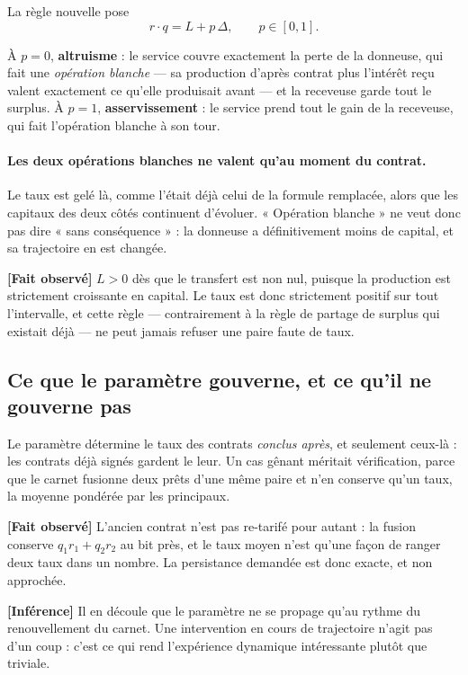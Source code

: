 \documentclass[11pt,a4paper]{article}
\newcommand{\fait}{\textbf{[Fait observé]}}
\newcommand{\inference}{\textbf{[Inférence]}}
\begin{document}
La règle nouvelle pose
\[
r \cdot q = L + p\,\Delta, \qquad p \in [0,1].
\]

À $p = 0$, \textbf{altruisme} : le service couvre exactement la perte de la
donneuse, qui fait une \emph{opération blanche} --- sa production d'après
contrat plus l'intérêt reçu valent exactement ce qu'elle produisait avant ---
et la receveuse garde tout le surplus. À $p = 1$,
\textbf{asservissement} : le service prend tout le gain de la receveuse, qui
fait l'opération blanche à son tour.

\paragraph{Les deux opérations blanches ne valent qu'au moment du contrat.}
Le taux est gelé là, comme l'était déjà celui de la formule remplacée, alors
que les capitaux des deux côtés continuent d'évoluer. « Opération blanche »
ne veut donc pas dire « sans conséquence » : la donneuse a définitivement
moins de capital, et sa trajectoire en est changée.

\fait{} $L > 0$ dès que le transfert est non nul, puisque la production est
strictement croissante en capital. Le taux est donc strictement positif sur
tout l'intervalle, et cette règle --- contrairement à la règle de partage de
surplus qui existait déjà --- ne peut jamais refuser une paire faute de taux.

\subsection{Ce que le paramètre gouverne, et ce qu'il ne gouverne pas}

Le paramètre détermine le taux des contrats \emph{conclus après}, et
seulement ceux-là : les contrats déjà signés gardent le leur. Un cas gênant
méritait vérification, parce que le carnet fusionne deux prêts d'une même
paire et n'en conserve qu'un taux, la moyenne pondérée par les principaux.

\fait{} L'ancien contrat n'est pas re-tarifé pour autant : la fusion conserve
$q_1 r_1 + q_2 r_2$ au bit près, et le taux moyen n'est qu'une façon de
ranger deux taux dans un nombre. La persistance demandée est donc exacte, et
non approchée.

\inference{} Il en découle que le paramètre ne se propage qu'au rythme du
renouvellement du carnet. Une intervention en cours de trajectoire n'agit pas
d'un coup : c'est ce qui rend l'expérience dynamique intéressante plutôt que
triviale.
\end{document}

